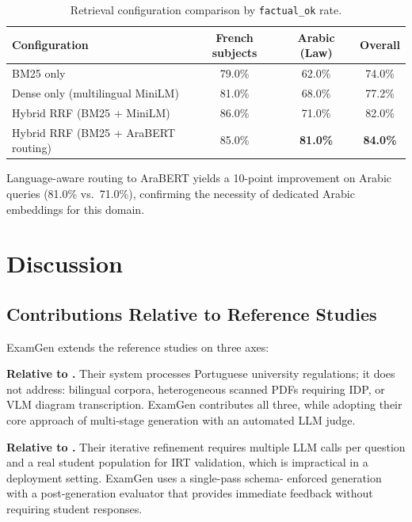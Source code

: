 \documentclass[12pt, a4paper]{article}
\begin{document}
\begin{table}[H]
\centering
\caption{Retrieval configuration comparison by \texttt{factual\_ok} rate.}
\label{tab:rag}
\begin{tabular}{lccc}
\toprule
\textbf{Configuration} & \textbf{French subjects} & \textbf{Arabic (Law)}
  & \textbf{Overall} \\
\midrule
BM25 only                            & 79.0\% & 62.0\% & 74.0\% \\
Dense only (multilingual MiniLM)     & 81.0\% & 68.0\% & 77.2\% \\
Hybrid RRF (BM25 + MiniLM)          & 86.0\% & 71.0\% & 82.0\% \\
Hybrid RRF (BM25 + AraBERT routing) & 85.0\% & \textbf{81.0\%} & \textbf{84.0\%} \\
\bottomrule
\end{tabular}
\end{table}

Language-aware routing to AraBERT yields a 10-point improvement on Arabic queries
(81.0\% vs.\ 71.0\%), confirming the necessity of dedicated Arabic embeddings for
this domain.

\section{Discussion}
\label{sec:discussion}

\subsection{Contributions Relative to Reference Studies}

ExamGen extends the reference studies on three axes:

\textbf{Relative to \citet{mucciaccia2025mcq}.} Their system processes Portuguese
university regulations; it does not address: bilingual corpora, heterogeneous
scanned PDFs requiring IDP, or VLM diagram transcription. ExamGen contributes
all three, while adopting their core approach of multi-stage generation with an
automated LLM judge.

\textbf{Relative to \citet{isley2025quality}.} Their iterative refinement requires
multiple LLM calls per question and a real student population for IRT validation,
which is impractical in a deployment setting. ExamGen uses a single-pass schema-
enforced generation with a post-generation evaluator that provides immediate
feedback without requiring student responses.
\end{document}
